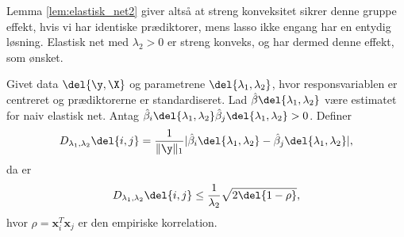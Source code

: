 Lemma \ref{lem:elastisk_net2} giver altså at streng konveksitet sikrer denne gruppe effekt, hvis vi har identiske prædiktorer, mens lasso ikke engang har en entydig løsning.
Elastisk net med \(\lambda_2 > 0\) er streng konveks, og har dermed denne effekt, som ønsket.
%
\begin{thm} \label{thm:elastisk_net}
Givet data \(\del{\y, \X}\) og parametrene \(\del{\lambda_1, \lambda_2}\), hvor responsvariablen er centreret og prædiktorerne er standardiseret.
Lad \(\hat{\beta} \del{\lambda_1, \lambda_2}\) være estimatet for naiv elastisk net.
Antag \(\hat{\beta}_i \del{\lambda_1, \lambda_2} \hat{\beta}_j \del{\lambda_1, \lambda_2} > 0\).
Definer
\begin{align*}
D_{\lambda_1, \lambda_2} \del{i,j} = \frac{1}{\Vert \y \Vert_1} \vert \hat{\beta}_i \del{\lambda_1, \lambda_2} - \hat{\beta}_j \del{\lambda_1, \lambda_2} \vert,
\end{align*}
da er
\begin{align}
D_{\lambda_1, \lambda_2} \del{i,j} \leq \frac{1}{\lambda_2} \sqrt{2 \del{1-\rho}}, \label{eq:EN5}
\end{align}
hvor \(\rho = \mathbf{x}_i^T \mathbf{x}_j\) er den empiriske korrelation.
\end{thm}
%
